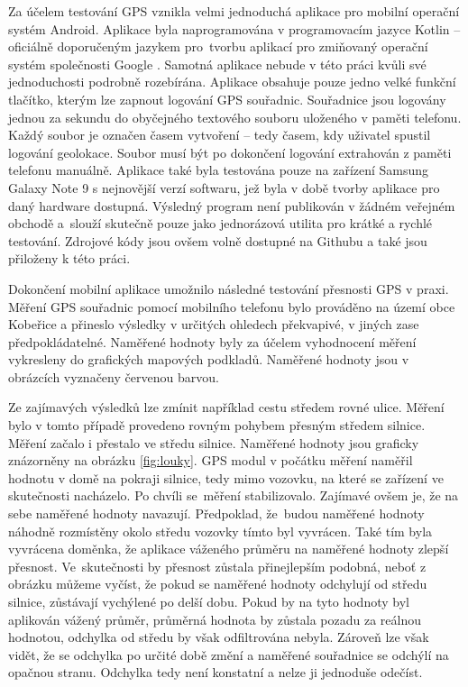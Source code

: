 \documentclass[czech, bachelor]{diploma}
\begin{document}
Za účelem testování GPS vznikla velmi jednoduchá aplikace pro mobilní operační systém Android. Aplikace byla naprogramována
v programovacím jazyce Kotlin -- oficiálně doporučeným jazykem pro~tvorbu aplikací pro zmiňovaný operační systém společnosti
Google \cite{kotlin-android-source}. Samotná aplikace nebude v této práci kvůli své jednoduchosti podrobně rozebírána. Aplikace
obsahuje pouze jedno velké funkční tlačítko, kterým lze zapnout logování GPS souřadnic. Souřadnice jsou logovány jednou za sekundu
do obyčejného textového souboru uloženého v paměti telefonu. Každý soubor je označen časem vytvoření -- tedy časem, kdy uživatel
spustil logování geolokace. Soubor musí být po dokončení logování extrahován z paměti telefonu manuálně. Aplikace také byla
testována pouze na zařízení Samsung Galaxy Note 9 s nejnovější verzí softwaru, jež byla v době tvorby aplikace pro daný hardware
dostupná. Výsledný program není publikován v žádném veřejném obchodě a~slouží skutečně pouze jako jednorázová utilita pro krátké
a rychlé testování. Zdrojové kódy jsou ovšem volně dostupné na Githubu \cite{geologger-source} a také jsou přiloženy k této práci.

Dokončení mobilní aplikace umožnilo následné testování přesnosti GPS v praxi. Měření GPS souřadnic pomocí mobilního telefonu bylo
prováděno na území obce Kobeřice a přineslo výsledky v určitých ohledech překvapivé, v jiných zase předpokládatelné. Naměřené
hodnoty byly za účelem vyhodnocení měření vykresleny do grafických mapových podkladů. Naměřené hodnoty jsou v obrázcích vyznačeny
červenou barvou.

Ze zajímavých výsledků lze zmínit například cestu středem rovné ulice. Měření bylo v tomto případě provedeno rovným pohybem
přesným středem silnice. Měření začalo i přestalo ve středu silnice. Naměřené hodnoty jsou graficky znázorněny na obrázku
\ref{fig:louky}. GPS modul v počátku měření naměřil hodnotu v domě na pokraji silnice, tedy mimo vozovku, na které se zařízení
ve skutečnosti nacházelo. Po chvíli se~měření stabilizovalo. Zajímavé ovšem je, že na sebe naměřené hodnoty navazují. Předpoklad,
že~budou naměřené hodnoty náhodně rozmístěny okolo středu vozovky tímto byl vyvrácen. Také tím byla vyvrácena doměnka, že aplikace
váženého průměru na naměřené hodnoty zlepší přesnost. Ve~skutečnosti by přesnost zůstala přinejlepším podobná, neboť z obrázku
můžeme vyčíst, že pokud se naměřené hodnoty odchylují od středu silnice, zůstávají vychýlené po delší dobu. Pokud by na tyto
hodnoty byl aplikován vážený průměr, průměrná hodnota by zůstala pozadu za reálnou hodnotou, odchylka od středu by však
odfiltrována nebyla. Zároveň lze však vidět, že se odchylka po určité době změní a naměřené souřadnice se odchýlí na opačnou
stranu. Odchylka tedy není konstatní a nelze ji jednoduše odečíst.
\end{document}
